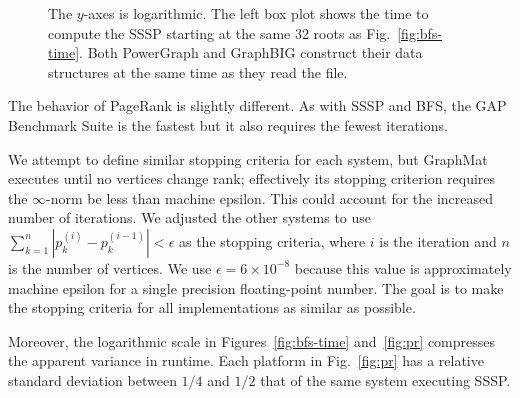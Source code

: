 \documentclass{llncs}
\begin{document}
\begin{figure}
\begin{minipage}{0.365\linewidth}
	\end{minipage}
	\caption{The $y$-axes is logarithmic. The left box plot shows the time to compute the SSSP starting at the same 32 roots as Fig.~\ref{fig:bfs-time}. Both PowerGraph and GraphBIG construct their data structures at the same time as they read the file.}
	\label{fig:sssp-time}
\end{figure}

The behavior of PageRank is slightly different. As with SSSP and BFS, the GAP Benchmark Suite is the fastest but it also requires the fewest iterations.

We attempt to define similar stopping criteria for each system, but GraphMat executes until no vertices change rank; effectively its stopping criterion requires the $\infty$-norm be less than machine epsilon. This could account for the increased number of iterations. We adjusted the other systems to use $\sum_{k=1}^{n} |p_k^{(i)} - p_k^{(i-1)}| < \epsilon $ as the stopping criteria, where $i$ is the iteration and $n$ is the number of vertices. We use $\epsilon = 6 \times 10^{-8}$ because this value is approximately machine epsilon for a single precision floating-point number. The goal is to make the stopping criteria for all implementations as similar as possible.

Moreover, the logarithmic scale in Figures~\ref{fig:bfs-time} and~\ref{fig:pr} compresses the apparent variance in runtime. Each platform in Fig.~\ref{fig:pr} has a relative standard deviation between $1/4$ and $1/2$ that of the same system executing SSSP.
\end{document}
